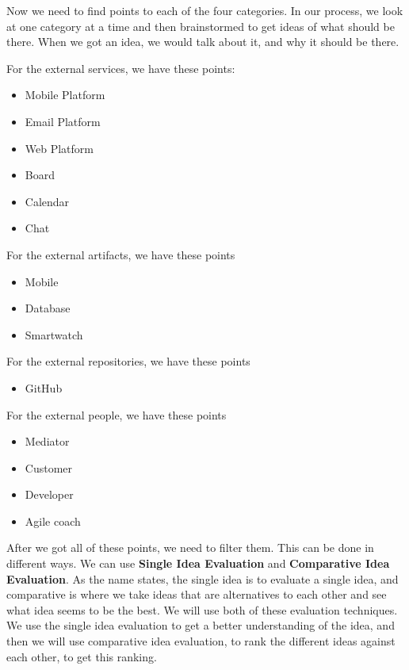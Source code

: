 Now we need to find points to each of the four categories.
In our process, we look at one category at a time and then brainstormed to get ideas of what should be there.
When we got an idea, we would talk about it, and why it should be there.

For the external services, we have these points:

\begin{itemize}
    \item Mobile Platform
    \item Email Platform
    \item Web Platform
    \item Board
    \item Calendar
    \item Chat 
\end{itemize}

For the external artifacts, we have these points

\begin{itemize}
    \item Mobile
    \item Database
    \item Smartwatch
\end{itemize}

For the external repositories, we have these points

\begin{itemize}
    \item GitHub
\end{itemize}

For the external people, we have these points

\begin{itemize}
    \item Mediator
    \item Customer
    \item Developer
    \item Agile coach
\end{itemize}

After we got all of these points, we need to filter them.
This can be done in different ways.
We can use \textbf{Single Idea Evaluation} and \textbf{Comparative Idea Evaluation}.
As the name states, the single idea is to evaluate a single idea, and comparative is where we take ideas that are alternatives to each other and see what idea seems to be the best.
We will use both of these evaluation techniques.
We use the single idea evaluation to get a better understanding of the idea, and then we will use comparative idea evaluation, to rank the different ideas against each other, to get this ranking.

